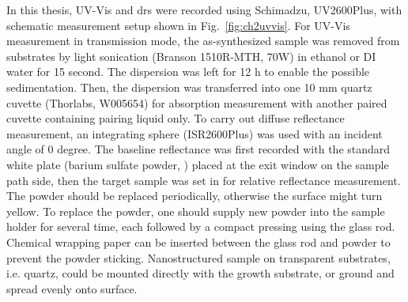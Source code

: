 In this thesis, UV-Vis and \gls{drs} were recorded using Schimadzu, UV2600Plus, with schematic measurement setup shown in Fig.~\ref{fig:ch2uvvis}. For UV-Vis measurement in transmission mode, the as-synthesized sample was removed from substrates by light sonication (Branson 1510R-MTH, 70W) in ethanol or DI water for 15 second. The dispersion was left for 12 h to enable the possible sedimentation. Then, the dispersion was transferred into one 10 mm quartz cuvette (Thorlabs, W005654) for absorption measurement with another paired cuvette containing pairing liquid only. To carry out diffuse reflectance measurement, an integrating sphere (ISR2600Plus) was used with an incident angle of 0 degree. The baseline reflectance was first recorded with the standard white plate (barium sulfate powder, ) placed at the exit window on the sample path side, then the target sample was set in for relative reflectance measurement. The  powder should be replaced periodically, otherwise the surface might turn yellow. To replace the  powder, one should supply new powder into the sample holder for several time, each followed by a compact pressing using the glass rod. Chemical wrapping paper can be inserted between the glass rod and  powder to prevent the powder sticking. Nanostructured sample on transparent substrates, i.e. quartz, could be mounted directly with the growth substrate, or ground and spread evenly onto  surface.\cite{isr2011}

